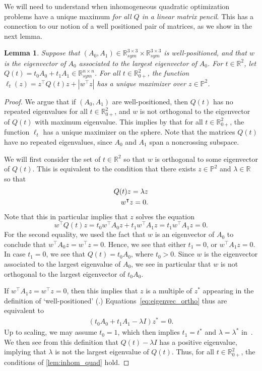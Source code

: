\documentclass{article}
\numberwithin{equation}{section}
\newcommand{\R}{\mathbb{R}}
\newcommand{\PP}{\mathbb{P}}
\newtheorem{lemma}{Lemma}[section]
\begin{document}
We will need to understand when inhomogeneous quadratic optimization problems have a unique maximum \emph{for all $Q$ in a linear matrix pencil}. This has a connection to our notion of a well positioned pair of matrices, as we show in the next lemma.
\begin{lemma}
    \label{lem:inhom_quad_pencil}
    Suppose that $(A_0,A_1) \in \R^{3\times 3}_{sym}\times\R^{3\times 3}_{sym}$ is well-positioned, and that $w$ is the eigenvector of $A_0$ associated to the largest eigenvector of $A_0$.
    For $t \in \R^2$, let $Q(t) = t_0A_0 + t_1 A_1 \in \R^{n\times n}_{sym}$.
    For all $t\in \R^2_{0+}$,
    the function $\ell_t(z) = z^{\intercal}Q(t)z + |w^{\intercal}z|$
    has a unique maximizer over $z\in \mathbb{P}^2$.
\end{lemma}
\begin{proof}

    We argue that if $(A_0, A_1)$ are well-positioned, then $Q(t)$ has no repeated eigenvalues for all $t \in \R^2_{0+}$, and $w$ is not orthogonal to the eigenvector of $Q(t)$ with maximum eigenvalue. This implies by  that for all $t \in \R^2_{0+}$, the function $\ell_t$ has a unique maximizer on the sphere. Note that the matrices $Q(t)$ have no repeated eigenvalues, since $A_0$ and $A_1$ span a noncrossing subspace.

    We will first consider the set of $t \in \R^2$ so that $w$ is orthogonal to some eigenvector of $Q(t)$. This is equivalent to the condition that there exists $z \in \PP^2$ and $\lambda \in \R$ so that
    \begin{align}
    \label{eq:eigenvec_ortho}
        Q(t) z  = \lambda z\\
        w^{\intercal} z = 0.\notag
    \end{align}
    Note that this in particular implies that $z$ solves the equation
    \[
        w^{\intercal} Q(t) z  = t_0w^{\intercal}A_0z + t_1w^{\intercal}A_1 z = t_1w^{\intercal}A_1 z = 0.
    \]
    For the second equality, we used the fact that $w$ is an eigenvector of $A_0$ to conclude that $w^{\intercal}A_0z = w^{\intercal}z = 0$.
    Hence, we see that  either $t_1 = 0$, or $w^{\intercal}A_1 z = 0$. In case $t_1 = 0$, we see that $Q(t) = t_0 A_0$, where $t_0 > 0$. Since $w$ is the eigenvector associated to the largest eigenvalue of $A_0$, we see in particular that $w$ is not orthogonal to the largest eigenvector of $t_0A_0$.

    If $w^{\intercal}A_1z = w^{\intercal}z = 0$, then this implies that $z$ is a multiple of $z^*$ appearing in the definition of `well-positioned' (.) Equations~\eqref{eq:eigenvec_ortho} thus are equivalent to
    \begin{align*}
        (t_0 A_0 + t_1 A_1 - \lambda I) z^* = 0.
    \end{align*}
    Up to scaling, we may assume $t_0 = 1$, which then implies $t_1 = t^*$ and $\lambda = \lambda^*$ in~.
    We then see from this definition that $Q(t) - \lambda I$ has a positive eigenvalue, implying that $\lambda$ is not the largest eigenvalue of $Q(t)$.
    Thus, for all $t \in \R^2_{0+}$, the conditions of \cref{lem:inhom_quad} hold.
    

\end{proof}
\end{document}
